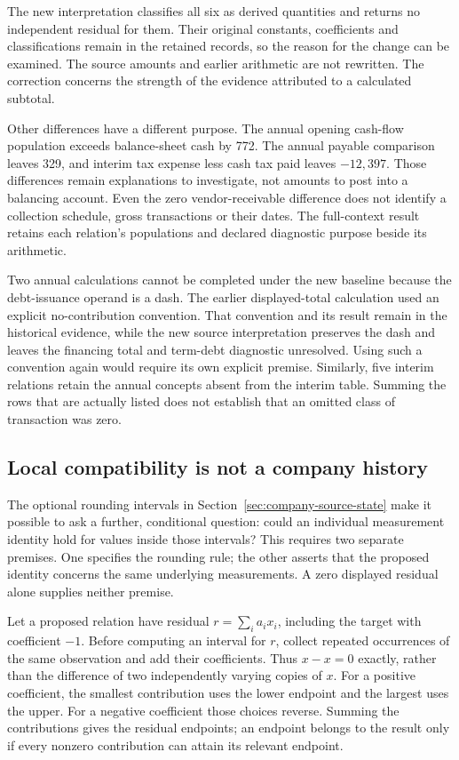 The new interpretation classifies all six as derived quantities and returns
no independent residual for them. Their original constants, coefficients
and classifications remain in the retained records, so the reason for the
change can be examined. The source amounts and earlier arithmetic are not
rewritten. The correction concerns the strength of the evidence attributed
to a calculated subtotal.

Other differences have a different purpose. The annual opening cash-flow
population exceeds balance-sheet cash by 772. The annual payable comparison
leaves 329, and interim tax expense less cash tax paid leaves
\(-12{,}397\). Those differences remain explanations to investigate, not
amounts to post into a balancing account. Even the zero vendor-receivable
difference does not identify a collection schedule, gross transactions or
their dates. The full-context result retains each relation's populations
and declared diagnostic purpose beside its arithmetic.

Two annual calculations cannot be completed under the new baseline because
the debt-issuance operand is a dash. The earlier displayed-total calculation
used an explicit no-contribution convention. That convention and its result
remain in the historical evidence, while the new source interpretation
preserves the dash and leaves the financing total and term-debt diagnostic
unresolved. Using such a convention again would require its own explicit
premise. Similarly, five interim relations retain the annual concepts absent
from the interim table. Summing the rows that are actually listed does not
establish that an omitted class of transaction was zero.

\subsection{Local compatibility is not a company history}

The optional rounding intervals in Section~\ref{sec:company-source-state}
make it possible to ask a further, conditional question: could an individual
measurement identity hold for values inside those intervals? This requires
two separate premises. One specifies the rounding rule; the other asserts
that the proposed identity concerns the same underlying measurements.
A zero displayed residual alone supplies neither premise.

Let a proposed relation have residual \(r=\sum_i a_i x_i\), including
the target with coefficient \(-1\). Before computing an interval for
\(r\), collect repeated occurrences of the same observation and add their
coefficients. Thus \(x-x=0\) exactly, rather than the difference of two
independently varying copies of \(x\). For a positive coefficient, the
smallest contribution uses the lower endpoint and the largest uses the
upper. For a negative coefficient those choices reverse. Summing the
contributions gives the residual endpoints; an endpoint belongs to the
result only if every nonzero contribution can attain its relevant endpoint.

